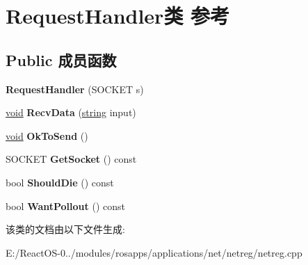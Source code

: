 \hypertarget{class_request_handler}{}\section{Request\+Handler类 参考}
\label{class_request_handler}
\subsection*{Public 成员函数}
\begin{DoxyCompactItemize}
\item 
\mbox{\label{class_request_handler_a955f5a88431bb387d1c2883119410f45}} 
{\bfseries Request\+Handler} (S\+O\+C\+K\+ET s)
\item 
\mbox{\label{class_request_handler_af95881c3e7954312c04198b3ade71e1d}} 
\hyperlink{interfacevoid}{void} {\bfseries Recv\+Data} (\hyperlink{structstring}{string} input)
\item 
\mbox{\label{class_request_handler_aa9099ae55411caba2fa8ca1dad82374d}} 
\hyperlink{interfacevoid}{void} {\bfseries Ok\+To\+Send} ()
\item 
\mbox{\label{class_request_handler_accc10660da811dead0f1f85af6f3e523}} 
S\+O\+C\+K\+ET {\bfseries Get\+Socket} () const
\item 
\mbox{\label{class_request_handler_ac5ef101743bf52c46e71c9f452169d81}} 
bool {\bfseries Should\+Die} () const
\item 
\mbox{\label{class_request_handler_a7b9c838dbc9387a4a096d4aee713f37f}} 
bool {\bfseries Want\+Pollout} () const
\end{DoxyCompactItemize}


该类的文档由以下文件生成\+:\begin{DoxyCompactItemize}
\item 
E\+:/\+React\+O\+S-\/0../modules/rosapps/applications/net/netreg/netreg.\+cpp\end{DoxyCompactItemize}
